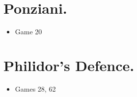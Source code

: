 \section{Ponziani.}
\newgame{}
\begin{itemize}
\item Game 20
\end{itemize}

\section{Philidor's Defence.}
\newgame{}
\begin{itemize}
\item Games 28, 62
\end{itemize}